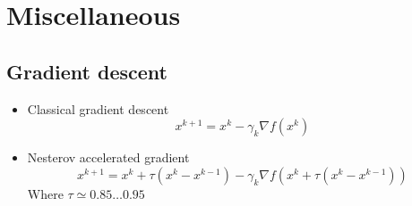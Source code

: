 \chapter{Miscellaneous}

\section{Gradient descent}
	\begin{itemize}
		\item Classical gradient descent
		$$x^{k + 1} = x^{k} - \gamma_k \nabla f(x^{k})$$
		\item Nesterov accelerated gradient
		$$x^{k + 1} = x^k + \tau(x^k - x^{k - 1}) - \gamma_k \nabla f(x^k + \tau(x^k - x^{k - 1}))$$
		Where $\tau \simeq 0.85 \ldots 0.95$
	\end{itemize}

	
